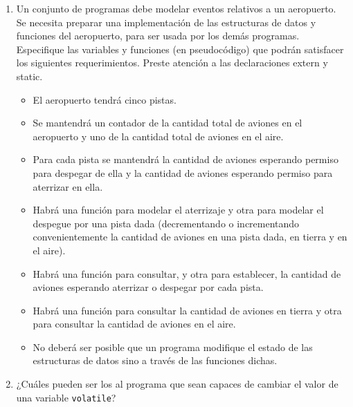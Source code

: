 \begin{enumerate}
\item  Un conjunto de programas debe modelar eventos relativos a un aeropuerto. Se necesita preparar una
implementación de las estructuras de datos y funciones del aeropuerto, para ser usada por los demás
programas. Especifique las variables y funciones (en pseudocódigo) que podrán satisfacer los
siguientes requerimientos. Preste atención a las declaraciones extern y static.
\begin{itemize}
	\item El aeropuerto tendrá cinco pistas.
\item Se mantendrá un contador de la cantidad total de aviones en el aeropuerto y uno de la cantidad
total de aviones en el aire.
\item Para cada pista se mantendrá la cantidad de aviones esperando permiso para despegar de ella y la
cantidad de aviones esperando permiso para aterrizar en ella.
\item Habrá una función para modelar el aterrizaje y otra para modelar el despegue por una pista dada
(decrementando o incrementando convenientemente la cantidad de aviones en una pista dada, en
tierra y en el aire).
\item Habrá una función para consultar, y otra para establecer, la cantidad de aviones esperando
aterrizar o despegar por cada pista.
\item Habrá una función para consultar la cantidad de aviones en tierra y otra para consultar la cantidad
de aviones en el aire.
\item No deberá ser posible que un programa modifique el estado de las estructuras de datos sino a
través de las funciones dichas.
\end{itemize}
\item ¿Cuáles pueden ser los  al programa que sean capaces de cambiar el valor de una variable \lstinline{volatile}?
\end{enumerate}



